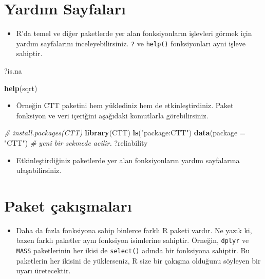 \documentclass[
  oneside]{book}
\newenvironment{Shaded}{\begin{snugshade}}{\end{snugshade}}
\newcommand{\AttributeTok}[1]{\textcolor[rgb]{0.13,0.29,0.53}{#1}}
\newcommand{\CommentTok}[1]{\textcolor[rgb]{0.56,0.35,0.01}{\textit{#1}}}
\newcommand{\FunctionTok}[1]{\textcolor[rgb]{0.13,0.29,0.53}{\textbf{#1}}}
\newcommand{\NormalTok}[1]{#1}
\newcommand{\StringTok}[1]{\textcolor[rgb]{0.31,0.60,0.02}{#1}}
\providecommand{\tightlist}{%
  \setlength{\itemsep}{0pt}\setlength{\parskip}{0pt}}
\begin{document}
\hypertarget{yardux131m-sayfalarux131}{%
\section{Yardım Sayfaları}\label{yardux131m-sayfalarux131}}

\begin{itemize}
\tightlist
\item
  R'da temel ve diğer paketlerde yer alan fonksiyonların işlevleri görmek için yardım sayfalarını inceleyebilirsiniz. \texttt{?} ve \texttt{help()} fonksiyonları ayni işleve sahiptir.
\end{itemize}

\begin{Shaded}
\begin{Highlighting}[]
\NormalTok{?is.na}

\FunctionTok{help}\NormalTok{(sqrt)}
\end{Highlighting}
\end{Shaded}

\begin{itemize}
\tightlist
\item
  Örneğin CTT paketini hem yüklediniz hem de etkinleştirdiniz. Paket fonksiyon ve veri içeriğini aşağıdaki komutlarla görebilirsiniz.
\end{itemize}

\begin{Shaded}
\begin{Highlighting}[]
\CommentTok{\# install.packages(CTT)}
\FunctionTok{library}\NormalTok{(CTT)}
\FunctionTok{ls}\NormalTok{(}\StringTok{"package:CTT"}\NormalTok{) }
\FunctionTok{data}\NormalTok{(}\AttributeTok{package =} \StringTok{"CTT"}\NormalTok{) }\CommentTok{\# yeni bir sekmede acilir.}
\NormalTok{?reliability}
\end{Highlighting}
\end{Shaded}

\begin{itemize}
\tightlist
\item
  Etkinleştirdiğiniz paketlerde yer alan fonksiyonların yardım sayfalarına ulaşabilirsiniz.
\end{itemize}

\hypertarget{conflicts}{%
\section{Paket çakışmaları}\label{conflicts}}

\begin{itemize}
\tightlist
\item
  Daha da fazla fonksiyona sahip binlerce farklı R paketi vardır. Ne yazık ki, bazen farklı paketler aynı fonksiyon isimlerine sahiptir. Örneğin, \texttt{dplyr} ve \texttt{MASS} paketlerinin her ikisi de \texttt{select()} adında bir fonksiyona sahiptir. Bu paketlerin her ikisini de yüklerseniz, R size bir çakışma olduğunu söyleyen bir uyarı üretecektir.
\end{itemize}
\end{document}
